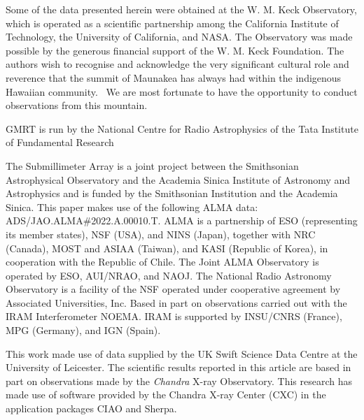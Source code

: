 \documentclass{nature_plusfigure}
\begin{document}
\begin{addendum}

Some of the data presented herein were obtained at the W. M. Keck Observatory, which is operated as a scientific partnership among the California Institute of Technology, the University of California, and NASA. The Observatory was made possible by the generous financial support of the W. M. Keck Foundation.
The authors wish to recognise and acknowledge the very significant cultural role and reverence that the summit of Maunakea has always had within the indigenous Hawaiian community.  We are most fortunate to have the opportunity to conduct observations from this mountain.

GMRT is run by the National Centre for Radio Astrophysics of the Tata Institute of Fundamental Research

The Submillimeter Array is a joint project between the Smithsonian Astrophysical Observatory and the Academia Sinica Institute of Astronomy and Astrophysics and is funded by the Smithsonian Institution and the Academia Sinica.
%
This paper makes use of the following ALMA data: ADS/JAO.ALMA\#2022.A.00010.T. ALMA is a partnership of ESO (representing its member states), NSF (USA), and NINS (Japan), together with NRC (Canada), MOST and ASIAA (Taiwan), and KASI (Republic of Korea), in cooperation with the Republic of Chile. The Joint ALMA Observatory is operated by ESO, AUI/NRAO, and NAOJ. The National Radio Astronomy Observatory is a facility of the NSF operated under cooperative agreement by Associated Universities, Inc.
%
Based in part on observations carried out with the IRAM Interferometer NOEMA. IRAM is supported by INSU/CNRS (France), MPG (Germany), and IGN (Spain).

This work made use of data supplied by the UK Swift Science Data Centre at the University of Leicester.
The scientific results reported in this article are based in part on observations made by the {\it Chandra} X-ray Observatory. This research has made use of software provided by the Chandra X-ray Center (CXC) in the application packages CIAO and Sherpa.


\end{addendum}
\end{document}

